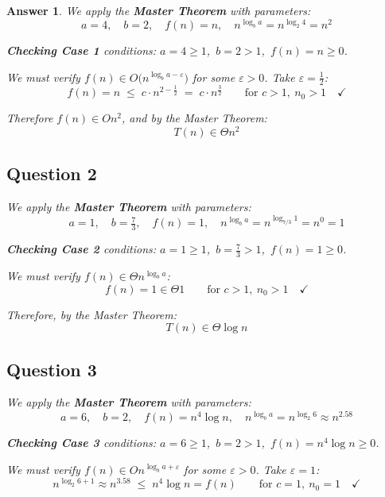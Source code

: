 \documentclass[a4paper]{article}
\theoremstyle{remarksStyle}
\theoremstyle{questionStyle}
\theoremstyle{answerStyle}
\newtheorem{answer}{Answer}
\begin{document}
\begin{answer} 
We apply the \textbf{Master Theorem} with parameters:
\[
    a = 4, \quad b = 2, \quad f(n) = n, \quad
    n^{\log_b a} = n^{\log_2 4} = n^2
\]

\noindent\textbf{Checking Case 1} conditions: $a = 4 \ge 1$,\ $b = 2 > 1$,\ $f(n) = n \ge 0$.

We must verify $f(n) \in O({n^{\log_b a - \varepsilon})}$ for some $\varepsilon > 0$.
Take $\varepsilon = \tfrac{1}{2}$:
\[
    f(n) = n \;\leq\; c \cdot n^{2 - \frac{1}{2}} \;=\; c \cdot n^{\frac{3}{2}}
    \qquad \text{for } c > 1,\ n_0 > 1 \quad\checkmark
\]

Therefore $f(n) \in O{n^2}$, and by the Master Theorem:
\[
    \boxed{T(n) \in \Theta{n^2}}
\]

\bigskip

\subsection*{Question 2}


We apply the \textbf{Master Theorem} with parameters:
\[
    a = 1, \quad b = \tfrac{7}{3}, \quad f(n) = 1, \quad
    n^{\log_b a} = n^{\log_{7/3} 1} = n^0 = 1
\]

\noindent\textbf{Checking Case 2} conditions: $a = 1 \ge 1$,\ $b = \tfrac{7}{3} > 1$,\ $f(n) = 1 \ge 0$.

We must verify $f(n) \in \Theta{n^{\log_b a}}$:
\[
    f(n) = 1 \in \Theta{1} \qquad \text{for } c > 1,\ n_0 > 1 \quad\checkmark
\]

Therefore, by the Master Theorem:
\[
    \boxed{T(n) \in \Theta{\log n}}
\]

\bigskip

\subsection*{Question 3}


We apply the \textbf{Master Theorem} with parameters:
\[
    a = 6, \quad b = 2, \quad f(n) = n^4 \log n, \quad
    n^{\log_b a} = n^{\log_2 6} \approx n^{2.58}
\]

\noindent\textbf{Checking Case 3} conditions: $a = 6 \ge 1$,\ $b = 2 > 1$,\ $f(n) = n^4 \log n \ge 0$.

We must verify $f(n) \in O{n^{\log_b a + \varepsilon}}$ for some $\varepsilon > 0$.
Take $\varepsilon = 1$:
\[
    n^{\log_2 6 + 1} \approx n^{3.58} \;\leq\; n^4 \log n = f(n)
    \qquad \text{for } c = 1,\ n_0 = 1 \quad\checkmark
\]


\end{answer}
\end{document}
